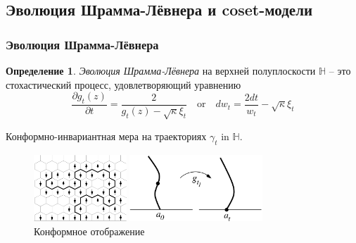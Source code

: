 \documentclass[pdftex]{beamer}
\theoremstyle{definition} \newtheorem{Def}{Определение}
\begin{document}
\subsection{Эволюция Шрамма-Лёвнера и coset-модели}
\label{sec:SLE}
\begin{frame}
  \frametitle{Эволюция Шрамма-Лёвнера}
  \begin{Def}
    {\it Эволюция Шрамма-Лёвнера} на верхней полуплоскости  $\mathbb{H}$ -- это стохастический процесс, удовлетворяющий уравнению
    \begin{equation*}
      \frac{\partial g_t(z)}{\partial t} = \frac{ 2}{g_t(z)-\sqrt{\kappa}\xi_{t}} \quad \text{or} \quad       d w _{t}= \frac{2dt}{w_{t} }-\sqrt{\kappa}\xi_{t}
    \end{equation*}
  \end{Def}
  Конформно-инвариантная мера на траекториях $\gamma_{t}$ in $\mathbb{H}$.
  \begin{figure}[h]
    \begin{multicols}{2}
      \hfill
      \includegraphics[height=25mm]{figures/explore.pdf}
      \caption{Эволюция Шрамма-Лёвнера -- непрерывный предел интерфейсов}
      \label{fig:sle}
      \hfill
      \includegraphics[width=50mm]{figures/loewner.pdf}
      \caption{Конформное отображение}
      \label{fig:sle}
    \end{multicols}

  \end{figure}
\end{frame}
\end{document}
